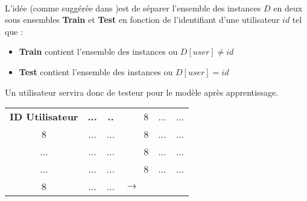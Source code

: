 \paragraph{}L'idée (comme suggérée dans \cite{datasetDetails} )est de séparer l'ensemble des instances $D$ en deux sous ensembles \textbf{Train} et \textbf{Test} en fonction de l'identifiant d'une utilisateur $id$ tel que : 
\begin{itemize}
	\item \textbf{Train} contient l'ensemble des instances ou $D[user]\ne id$
	\item \textbf{Test} contient l'ensemble des instances ou $D[user] = id$
\end{itemize}
\par 
Un utilisateur servira donc de testeur pour le modèle après apprentissage.
\begin{table}[H]
	\centering
	\begin{tabular}{|c|c|c|lllll}
		\cline{1-3} \cline{6-8}
		\textbf{ID Utilisateur}   & \textbf{...}                & \textbf{..}                 &                    & \multicolumn{1}{c|}{} & \multicolumn{1}{c|}{\cellcolor[HTML]{9AFF99}8} & \multicolumn{1}{c|}{\cellcolor[HTML]{9AFF99}...} & \multicolumn{1}{c|}{...} \\ \cline{1-3} \cline{6-8} 
		\cellcolor[HTML]{9AFF99}8 & \cellcolor[HTML]{9AFF99}... & \cellcolor[HTML]{9AFF99}... &                    & \multicolumn{1}{c|}{} & \multicolumn{1}{c|}{\cellcolor[HTML]{9AFF99}8} & \multicolumn{1}{c|}{\cellcolor[HTML]{9AFF99}...} & \multicolumn{1}{c|}{...} \\ \cline{1-3} \cline{6-8} 
		...                       & ...                         & ...                         &                    & \multicolumn{1}{c|}{} & \multicolumn{1}{c|}{\cellcolor[HTML]{9AFF99}8} & \multicolumn{1}{c|}{\cellcolor[HTML]{9AFF99}...} & \multicolumn{1}{c|}{...} \\ \cline{1-3} \cline{6-8} 
		...                       & ...                         & ...                         & \multirow{-4}{*}{} & \multicolumn{1}{c|}{} & \multicolumn{1}{c|}{\cellcolor[HTML]{9AFF99}8} & \multicolumn{1}{c|}{\cellcolor[HTML]{9AFF99}...} & \multicolumn{1}{c|}{...} \\ \cline{1-3} \cline{6-8} 
		\cellcolor[HTML]{9AFF99}8 & \cellcolor[HTML]{9AFF99}... & \cellcolor[HTML]{9AFF99}... & \multicolumn{4}{l}{$\rightarrow$}                                                                                                              &                          \\ \cline{1-3} \cline{6-8} 

\end{tabular}
\end{table}
